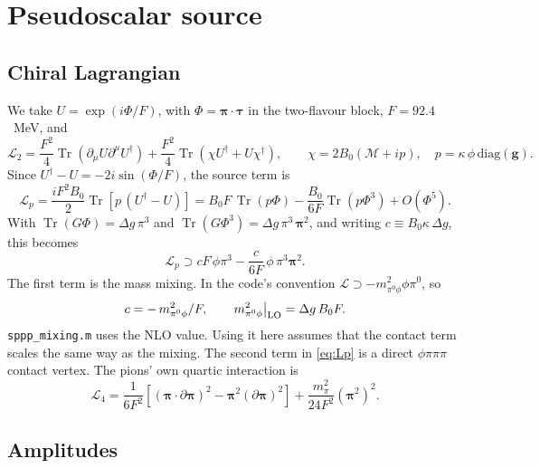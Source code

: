 \documentclass{article}
\newcommand{\tr}{\operatorname{Tr}}
\newcommand{\mpi}{m_\pi}
\newcommand{\Dg}{\Delta g}
\begin{document}
\section{Pseudoscalar source}

\subsection{Chiral Lagrangian}

We take $U=\exp(i\Phi/F)$, with $\Phi=\boldsymbol\pi\cdot\boldsymbol\tau$ in the two-flavour block,
$F=92.4$~MeV, and
\begin{equation}
  \mathcal L_2=\frac{F^2}{4}\tr(\partial_\mu U\partial^\mu U^\dagger)
  +\frac{F^2}{4}\tr(\chi U^\dagger+U\chi^\dagger),\qquad
  \chi=2B_0(\mathcal M+ip),\quad p=\kappa\,\phi\,\mathrm{diag}(\mathbf g).
\end{equation}
Since $U^\dagger-U=-2i\sin(\Phi/F)$, the source term is
\begin{equation}
  \mathcal L_p=\frac{iF^2B_0}{2}\tr\!\left[p\,(U^\dagger-U)\right]
  =B_0F\,\tr(p\Phi)-\frac{B_0}{6F}\tr(p\Phi^3)+O(\Phi^5).
\end{equation}
With $\tr(G\Phi)=\Dg\,\pi^3$ and $\tr(G\Phi^3)=\Dg\,\pi^3\,\boldsymbol\pi^2$, and writing
$c\equiv B_0\kappa\,\Dg$, this becomes
\begin{equation}
  \mathcal L_p\supset cF\,\phi\pi^3-\frac{c}{6F}\,\phi\,\pi^3\boldsymbol\pi^2 .
  \label{eq:Lp}
\end{equation}
The first term is the mass mixing. In the code's convention
$\mathcal L\supset-m^2_{\pi^0\phi}\phi\pi^0$, so
\begin{equation}
  c=-\,m^2_{\pi^0\phi}/F,\qquad m^2_{\pi^0\phi}\big|_{\rm LO}=\Dg\,B_0F .
\end{equation}
\texttt{sppp\_mixing.m} uses the NLO value. Using it here assumes that the contact term scales the
same way as the mixing. The second term in \eqref{eq:Lp} is a direct $\phi\pi\pi\pi$ contact
vertex. The pions' own quartic interaction is
\begin{equation}
  \mathcal L_4=\frac{1}{6F^2}\left[(\boldsymbol\pi\cdot\partial\boldsymbol\pi)^2
  -\boldsymbol\pi^2(\partial\boldsymbol\pi)^2\right]+\frac{\mpi^2}{24F^2}(\boldsymbol\pi^2)^2 .
\end{equation}

\subsection{Amplitudes}
\end{document}
